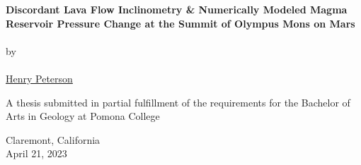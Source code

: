 \begin{titlepage}
    \begin{center}

        \phantom{.}

        \vfill
 
        \large\textbf{Discordant Lava Flow Inclinometry \& Numerically Modeled Magma Reservoir Pressure Change at the Summit of Olympus Mons on Mars}
        \\~\\
        by
        \\~\\
        \href{mailto:hgpa2018@mymail.pomona.edu}{Henry Peterson}

        \vfill
        \vfill
        \vfill

        A thesis submitted in partial fulfillment of the requirements for the Bachelor of Arts in Geology at Pomona College

             
        \vfill
        \vfill
        \vfill

        Claremont, California\\
        April 21, 2023

    \end{center}
 \end{titlepage}
